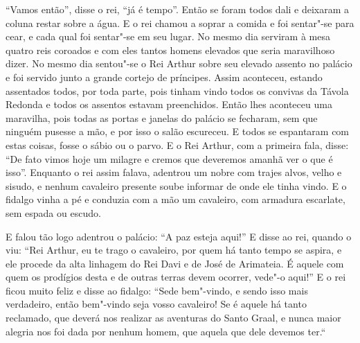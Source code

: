 “Vamos então”, disse o rei, “já é tempo”. Então se foram todos dali e deixaram a
coluna restar sobre a água. E o rei chamou a soprar a comida e foi sentar"-se
para cear, e cada qual foi sentar"-se em seu lugar. No mesmo dia serviram à mesa
quatro reis coroados e com eles tantos homens elevados que seria maravilhoso dizer.
No mesmo dia sentou"-se o Rei Arthur sobre seu elevado assento no palácio e foi
servido junto a grande cortejo de príncipes. Assim aconteceu, estando
assentados todos, por toda parte, pois tinham vindo todos os convivas da Távola
Redonda e todos os assentos estavam preenchidos. Então lhes aconteceu uma
maravilha, pois todas as portas e janelas do palácio se fecharam, sem que
ninguém pusesse a mão, e por isso o salão escureceu. E todos se espantaram com
estas coisas, fosse o sábio ou o parvo. E o Rei Arthur, com a primeira fala,
disse: “De fato vimos hoje um milagre e cremos que deveremos amanhã ver o que é
isso”. Enquanto o rei assim falava, adentrou um nobre com trajes alvos, velho e
sisudo, e nenhum cavaleiro presente soube informar de onde ele tinha vindo. E o
fidalgo vinha a pé e conduzia com a mão um cavaleiro, com armadura escarlate,
sem espada ou escudo. 

E falou tão logo adentrou o palácio: “A paz esteja aqui!” E disse ao rei,
quando o viu: “Rei Arthur, eu te trago o cavaleiro, por quem há tanto tempo se
aspira, e ele procede da alta linhagem do Rei Davi e de José de Arimateia. É
aquele com quem os prodígios desta e de outras terras devem ocorrer, vede"-o
aqui!” E o rei ficou muito feliz e disse ao fidalgo: “Sede bem"-vindo, e sendo
isso mais verdadeiro, então bem"-vindo seja vosso cavaleiro! Se é aquele há
tanto reclamado, que deverá nos realizar as aventuras do Santo Graal, e nunca
maior alegria nos foi dada por nenhum homem, que aquela que dele devemos ter.`` 

